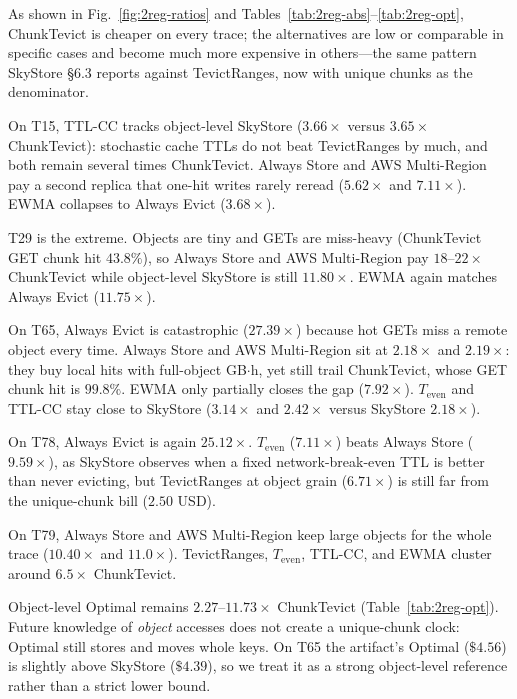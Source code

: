 As shown in Fig.~\ref{fig:2reg-ratios} and Tables~\ref{tab:2reg-abs}--\ref{tab:2reg-opt}, ChunkTevict is cheaper on every trace; the alternatives are low or comparable in specific cases and become much more expensive in others---the same pattern SkyStore §6.3 reports against TevictRanges, now with unique chunks as the denominator.

On {T}15, {TTL}-{CC} tracks object-level SkyStore ($3.66\times$ versus $3.65\times$ ChunkTevict): stochastic cache {TTL}s do not beat TevictRanges by much, and both remain several times ChunkTevict.
Always Store and {AWS} Multi-Region pay a second replica that one-hit writes rarely reread ($5.62\times$ and $7.11\times$).
{EWMA} collapses to Always Evict ($3.68\times$).

{T}29 is the extreme.
Objects are tiny and {GET}s are miss-heavy (ChunkTevict {GET} chunk hit $43.8\%$), so Always Store and {AWS} Multi-Region pay $18$--$22\times$ ChunkTevict while object-level SkyStore is still $11.80\times$.
{EWMA} again matches Always Evict ($11.75\times$).

On {T}65, Always Evict is catastrophic ($27.39\times$) because hot {GET}s miss a remote object every time.
Always Store and {AWS} Multi-Region sit at $2.18\times$ and $2.19\times$: they buy local hits with full-object {GB}$\cdot$h, yet still trail ChunkTevict, whose {GET} chunk hit is $99.8\%$.
{EWMA} only partially closes the gap ($7.92\times$).
$T_{\mathrm{even}}$ and {TTL}-{CC} stay close to SkyStore ($3.14\times$ and $2.42\times$ versus SkyStore $2.18\times$).

On {T}78, Always Evict is again $25.12\times$.
$T_{\mathrm{even}}$ ($7.11\times$) beats Always Store ($9.59\times$), as SkyStore observes when a fixed network-break-even {TTL} is better than never evicting, but TevictRanges at object grain ($6.71\times$) is still far from the unique-chunk bill ($2.50$ {USD}).

On {T}79, Always Store and {AWS} Multi-Region keep large objects for the whole trace ($10.40\times$ and $11.0\times$).
TevictRanges, $T_{\mathrm{even}}$, {TTL}-{CC}, and {EWMA} cluster around $6.5\times$ ChunkTevict.

Object-level Optimal remains $2.27$--$11.73\times$ ChunkTevict (Table~\ref{tab:2reg-opt}).
Future knowledge of \emph{object} accesses does not create a unique-chunk clock: Optimal still stores and moves whole keys.
On {T}65 the artifact's Optimal ($\$4.56$) is slightly above SkyStore ($\$4.39$), so we treat it as a strong object-level reference rather than a strict lower bound.

